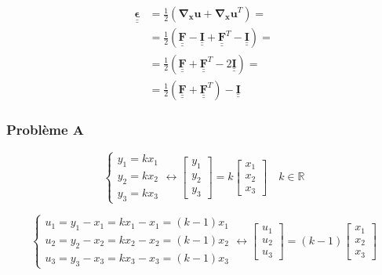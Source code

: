 \documentclass
[
a4paper,                      %
twoside,					  %
12pt,                         %
abstract,		      %
fleqn,                        %
]
{scrartcl} %
\begin{document}
\begin{equation}
\begin{aligned}
\mathbf{\underline{\underline{\epsilon}}}&=\frac{1}{2}\left(\mathbf{\nabla_{x}u}+\mathbf{\nabla_{x}u}^{T}\right)=\\
&=\frac{1}{2}\left(\mathbf{\underline{\underline{F}}}-\mathbf{\underline{\underline{I}}}+\mathbf{\underline{\underline{F}}}^{T}-\mathbf{\underline{\underline{I}}}\right)=\\
&=\frac{1}{2}\left(\mathbf{\underline{\underline{F}}}+\mathbf{\underline{\underline{F}}}^{T}-2\mathbf{\underline{\underline{I}}}\right)=\\
&=\frac{1}{2}\left(\mathbf{\underline{\underline{F}}}+\mathbf{\underline{\underline{F}}}^{T}\right)-\mathbf{\underline{\underline{I}}}
\end{aligned}
\end{equation}

\subsubsection{Probl\`eme A}

\begin{equation}
\begin{cases}
y_{1}=kx_{1}\\
y_{2}=kx_{2}\\
y_{3}=kx_{3}
\end{cases}\longleftrightarrow\begin{bmatrix}
y_{1}\\
y_{2}\\
y_{3}\end{bmatrix}=k\begin{bmatrix}
x_{1}\\
x_{2}\\
x_{3}\end{bmatrix}\quad k\in\mathbb{R}
\end{equation}

\begin{equation}
\begin{cases}
u_{1}=y_{1}-x_{1}=kx_{1}-x_{1}=\left(k-1\right)x_{1}\\
u_{2}=y_{2}-x_{2}=kx_{2}-x_{2}=\left(k-1\right)x_{2}\\
u_{3}=y_{3}-x_{3}=kx_{3}-x_{3}=\left(k-1\right)x_{3}
\end{cases}\longleftrightarrow\begin{bmatrix}
u_{1}\\
u_{2}\\
u_{3}\end{bmatrix}=\left(k-1\right)\begin{bmatrix}
x_{1}\\
x_{2}\\
x_{3}\end{bmatrix}
\end{equation}
\end{document}
